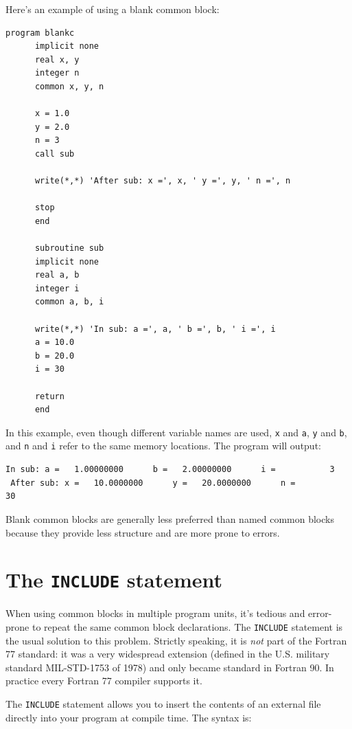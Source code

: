 Here's an example of using a blank common block:

\begin{lstlisting}[style=fortran77]
      program blankc
      implicit none
      real x, y
      integer n
      common x, y, n

      x = 1.0
      y = 2.0
      n = 3
      call sub

      write(*,*) 'After sub: x =', x, ' y =', y, ' n =', n

      stop
      end

      subroutine sub
      implicit none
      real a, b
      integer i
      common a, b, i

      write(*,*) 'In sub: a =', a, ' b =', b, ' i =', i
      a = 10.0
      b = 20.0
      i = 30

      return
      end
\end{lstlisting}

In this example, even though different variable names are used, \texttt{x} and \texttt{a}, \texttt{y} and \texttt{b}, and \texttt{n} and \texttt{i} refer to the same memory locations. The program will output:

\begin{lstlisting}[style=output]
 In sub: a =   1.00000000      b =   2.00000000      i =           3
 After sub: x =   10.0000000      y =   20.0000000      n =          30
\end{lstlisting}

Blank common blocks are generally less preferred than named common blocks because they provide less structure and are more prone to errors.

\section{The \texttt{INCLUDE} statement}

When using common blocks in multiple program units, it's tedious and error-prone to repeat the same common block declarations. The \texttt{INCLUDE} statement is the usual solution to this problem. Strictly speaking, it is \emph{not} part of the Fortran 77 standard: it was a very widespread extension (defined in the U.S. military standard MIL-STD-1753 of 1978) and only became standard in Fortran 90. In practice every Fortran 77 compiler supports it.

The \texttt{INCLUDE} statement allows you to insert the contents of an external file directly into your program at compile time. The syntax is:

